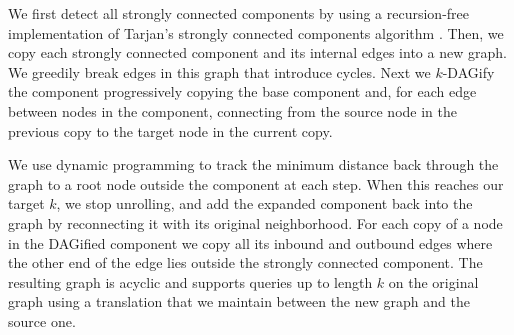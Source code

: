 We first detect all strongly connected components by using a recursion-free implementation of Tarjan's strongly connected components algorithm \cite{tarjan1972depth}.
Then, we copy each strongly connected component and its internal edges into a new graph.
We greedily break edges in this graph that introduce cycles.
Next we $k$-DAGify the component progressively copying the base component and, for each edge between nodes in the component, connecting from the source node in the previous copy to the target node in the current copy.

We use dynamic programming to track the minimum distance back through the graph to a root node outside the component at each step.
When this reaches our target $k$, we stop unrolling, and add the expanded component back into the graph by reconnecting it with its original neighborhood.
For each copy of a node in the DAGified component we copy all its inbound and outbound edges where the other end of the edge lies outside the strongly connected component.
The resulting graph is acyclic and supports queries up to length $k$ on the original graph using a translation that we maintain between the new graph and the source one.

